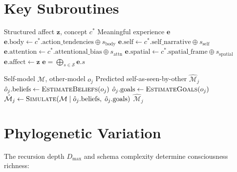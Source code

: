 \documentclass[11pt]{article}
\begin{document}
\section{Key Subroutines}

\begin{algorithm}[H]
\caption{\textsc{MeaningfulIntegration} --- Constituting Experience from Affect + Concepts}
\label{alg:mi}
\begin{algorithmic}[1]
\Require Structured affect $\mathbf{z}$, concept $c^*$
\Ensure Meaningful experience $\mathbf{e}$
\State $\mathbf{e}.\text{body} \gets c^*.\text{action\_tendencies} \oplus s_\text{body}$
\State $\mathbf{e}.\text{self} \gets c^*.\text{self\_narrative} \oplus s_\text{self}$
\State $\mathbf{e}.\text{attention} \gets c^*.\text{attentional\_bias} \oplus s_\text{attn}$
\State $\mathbf{e}.\text{spatial} \gets c^*.\text{spatial\_frame} \oplus s_\text{spatial}$
\State $\mathbf{e}.\text{affect} \gets \mathbf{z}$
\State \Return $\mathbf{e} = \bigoplus_{s \in \mathcal{S}} \mathbf{e}.s$
\end{algorithmic}
\end{algorithm}

\begin{algorithm}[H]
\caption{\textsc{PredictSelfAsSeenBy} --- Social-Perspective Recursion}
\label{alg:social}
\begin{algorithmic}[1]
\Require Self-model $\mathcal{M}$, other-model $o_j$
\Ensure Predicted self-as-seen-by-other $\hat{\mathcal{M}}_j$
\State $\hat{o}_j.\text{beliefs} \gets \textsc{EstimateBeliefs}(o_j)$
\State $\hat{o}_j.\text{goals} \gets \textsc{EstimateGoals}(o_j)$
\State $\hat{\mathcal{M}}_j \gets \textsc{Simulate}(\mathcal{M} \mid \hat{o}_j.\text{beliefs},\; \hat{o}_j.\text{goals})$
\State \Return $\hat{\mathcal{M}}_j$
\end{algorithmic}
\end{algorithm}

\section{Phylogenetic Variation}

The recursion depth $D_{\max}$ and schema complexity determine consciousness richness:
\end{document}
